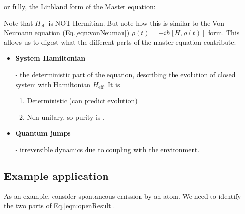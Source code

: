 \noindent or fully, the Linbland form of the Master equation:


\noindent Note that $H_\text{eff}$ is  NOT Hermitian. But note how this
is  similar  to  the Von  Neumann  equation  (Eq.\eqref{eqn:vonNeuman})
$\dot{\rho}(t) = -i\hbar\left[H,\rho(t)\right]$ form. This allows us to
digest what the different parts of the master equation contribute:

\begin{itemize}
\item \textbf{System Hamiltonian}

      -   the
  deterministic  part  of the  equation,  describing  the evolution  of
  closed system with Hamiltonian $H_\text{eff}$. It is
  \begin{enumerate}
  \item Deterministic (can predict evolution)
  \item Non-unitary, so purity is \textbf{}.
  \end{enumerate}

\item \textbf{Quantum jumps}

      -   irreversible
  dynamics due to coupling with the environment.
\end{itemize}

\subsection{Example application}
As an  example, consider spontaneous  emission by  an atom. We  need to
identify the two parts of Eq.\eqref{eqn:openResult}.

